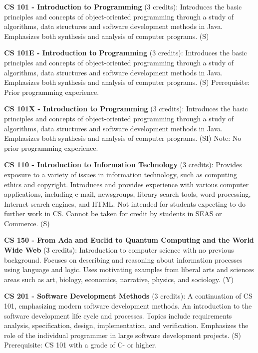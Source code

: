 \documentclass[12pt,twoside]{article}
\begin{document}
\bigskip

{\bf\noindent CS 101 - Introduction to Programming} (3 credits):
Introduces the basic principles and concepts of object-oriented
programming through a study of algorithms, data structures and
software development methods in Java. Emphasizes both synthesis and
analysis of computer programs. (S)
      
{\bf\noindent CS 101E - Introduction to Programming} (3 credits):
Introduces the basic principles and concepts of object-oriented
programming through a study of algorithms, data structures and
software development methods in Java. Emphasizes both synthesis and
analysis of computer programs. (S) Prerequisite: Prior programming
experience.
      
{\bf\noindent CS 101X - Introduction to Programming} (3 credits):
Introduces the basic principles and concepts of object-oriented
programming through a study of algorithms, data structures and
software development methods in Java. Emphasizes both synthesis and
analysis of computer programs. (SI) Note: No prior programming
experience.
      
{\bf\noindent CS 110 - Introduction to Information Technology} (3
credits): Provides exposure to a variety of issues in information
technology, such as computing ethics and copyright. Introduces and
provides experience with various computer applications, including
e-mail, newsgroups, library search tools, word processing, Internet
search engines, and HTML. Not intended for students expecting to do
further work in CS. Cannot be taken for credit by students in SEAS or
Commerce. (S)
      

{\bf\noindent CS 150 - From Ada and Euclid to Quantum Computing and
the World Wide Web} (3 credits): Introduction to computer science with
no previous background.  Focuses on describing and reasoning about
information processes using language and logic.  Uses motivating
examples from liberal arts and sciences areas such as art, biology,
economics, narrative, physics, and sociology. (Y)

{\bf\noindent CS 201 - Software Development Methods} (3 credits): A
continuation of CS 101, emphasizing modern software development
methods. An introduction to the software development life cycle and
processes. Topics include requirements analysis, specification,
design, implementation, and verification. Emphasizes the role of the
individual programmer in large software development projects. (S)
Prerequisite: CS 101 with a grade of C- or higher.
\end{document}
